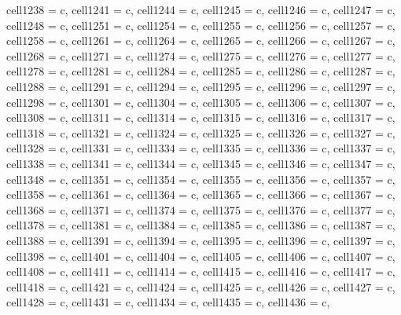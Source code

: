 \begin{longtblr}[
  label = none,
  entry = none,
]
{  cell{123}{8} = {c},
  cell{124}{1} = {c},
  cell{124}{4} = {c},
  cell{124}{5} = {c},
  cell{124}{6} = {c},
  cell{124}{7} = {c},
  cell{124}{8} = {c},
  cell{125}{1} = {c},
  cell{125}{4} = {c},
  cell{125}{5} = {c},
  cell{125}{6} = {c},
  cell{125}{7} = {c},
  cell{125}{8} = {c},
  cell{126}{1} = {c},
  cell{126}{4} = {c},
  cell{126}{5} = {c},
  cell{126}{6} = {c},
  cell{126}{7} = {c},
  cell{126}{8} = {c},
  cell{127}{1} = {c},
  cell{127}{4} = {c},
  cell{127}{5} = {c},
  cell{127}{6} = {c},
  cell{127}{7} = {c},
  cell{127}{8} = {c},
  cell{128}{1} = {c},
  cell{128}{4} = {c},
  cell{128}{5} = {c},
  cell{128}{6} = {c},
  cell{128}{7} = {c},
  cell{128}{8} = {c},
  cell{129}{1} = {c},
  cell{129}{4} = {c},
  cell{129}{5} = {c},
  cell{129}{6} = {c},
  cell{129}{7} = {c},
  cell{129}{8} = {c},
  cell{130}{1} = {c},
  cell{130}{4} = {c},
  cell{130}{5} = {c},
  cell{130}{6} = {c},
  cell{130}{7} = {c},
  cell{130}{8} = {c},
  cell{131}{1} = {c},
  cell{131}{4} = {c},
  cell{131}{5} = {c},
  cell{131}{6} = {c},
  cell{131}{7} = {c},
  cell{131}{8} = {c},
  cell{132}{1} = {c},
  cell{132}{4} = {c},
  cell{132}{5} = {c},
  cell{132}{6} = {c},
  cell{132}{7} = {c},
  cell{132}{8} = {c},
  cell{133}{1} = {c},
  cell{133}{4} = {c},
  cell{133}{5} = {c},
  cell{133}{6} = {c},
  cell{133}{7} = {c},
  cell{133}{8} = {c},
  cell{134}{1} = {c},
  cell{134}{4} = {c},
  cell{134}{5} = {c},
  cell{134}{6} = {c},
  cell{134}{7} = {c},
  cell{134}{8} = {c},
  cell{135}{1} = {c},
  cell{135}{4} = {c},
  cell{135}{5} = {c},
  cell{135}{6} = {c},
  cell{135}{7} = {c},
  cell{135}{8} = {c},
  cell{136}{1} = {c},
  cell{136}{4} = {c},
  cell{136}{5} = {c},
  cell{136}{6} = {c},
  cell{136}{7} = {c},
  cell{136}{8} = {c},
  cell{137}{1} = {c},
  cell{137}{4} = {c},
  cell{137}{5} = {c},
  cell{137}{6} = {c},
  cell{137}{7} = {c},
  cell{137}{8} = {c},
  cell{138}{1} = {c},
  cell{138}{4} = {c},
  cell{138}{5} = {c},
  cell{138}{6} = {c},
  cell{138}{7} = {c},
  cell{138}{8} = {c},
  cell{139}{1} = {c},
  cell{139}{4} = {c},
  cell{139}{5} = {c},
  cell{139}{6} = {c},
  cell{139}{7} = {c},
  cell{139}{8} = {c},
  cell{140}{1} = {c},
  cell{140}{4} = {c},
  cell{140}{5} = {c},
  cell{140}{6} = {c},
  cell{140}{7} = {c},
  cell{140}{8} = {c},
  cell{141}{1} = {c},
  cell{141}{4} = {c},
  cell{141}{5} = {c},
  cell{141}{6} = {c},
  cell{141}{7} = {c},
  cell{141}{8} = {c},
  cell{142}{1} = {c},
  cell{142}{4} = {c},
  cell{142}{5} = {c},
  cell{142}{6} = {c},
  cell{142}{7} = {c},
  cell{142}{8} = {c},
  cell{143}{1} = {c},
  cell{143}{4} = {c},
  cell{143}{5} = {c},
  cell{143}{6} = {c},
}
\end{longtblr}
